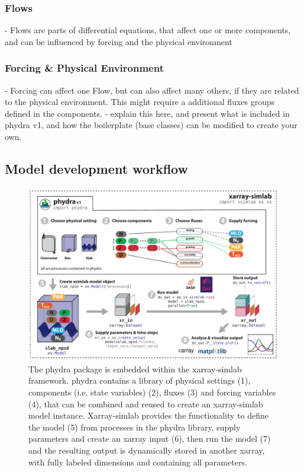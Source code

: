 \documentclass[template.tex]{subfiles}
\begin{document}
\subsubsection{Flows}
- Flows are parts of differential equations, that affect one or more components, and can be influenced by forcing and the physical environment

\subsubsection{Forcing & Physical Environment}
- Forcing can affect one Flow, but can also affect many others, if they are related to the physical environment. This might require a additional fluxes groups defined in the components. 
- explain this here, and present what is included in phydra v1, and how the boilerplate (base classes) can be modified to create your own.

\subsection{Model development workflow}

%
\begin{figure}[t]
\includegraphics[width=12cm]{Figures/firstdraft_schematics/01__schematics_phydra_1.pdf}
\caption{The phydra package is embedded within the xarray-simlab framework. phydra contains a library of physical settings (1), components (i.e. state variables) (2), fluxes (3) and forcing variables (4), that can be combined and reused to create an xarray-simlab model instance. Xarray-simlab provides the functionality to define the model (5) from processes in the phydra library, supply parameters and create an xarray input (6), then run the model (7) and the resulting output is dynamically stored in another xarray, with fully labeled dimensions and containing all parameters.}
\label{phydraschematics}
\end{figure}
\end{document}
